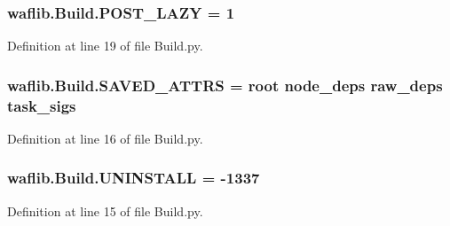 \subsubsection[{\texorpdfstring{P\+O\+S\+T\+\_\+\+L\+A\+ZY}{POST_LAZY}}]{ waflib.\+Build.\+P\+O\+S\+T\+\_\+\+L\+A\+ZY = 1}\hypertarget{namespacewaflib_1_1_build_a475148bf09bf59e2c04c062b0b1b459c}{}\label{namespacewaflib_1_1_build_a475148bf09bf59e2c04c062b0b1b459c}


Definition at line 19 of file Build.\+py.

\subsubsection[{\texorpdfstring{S\+A\+V\+E\+D\+\_\+\+A\+T\+T\+RS}{SAVED_ATTRS}}]{ waflib.\+Build.\+S\+A\+V\+E\+D\+\_\+\+A\+T\+T\+RS = \textquotesingle{}root node\+\_\+deps raw\+\_\+deps task\+\_\+sigs\textquotesingle{}}\hypertarget{namespacewaflib_1_1_build_a4ced62ee7882805b2884b4f334cdfaf7}{}\label{namespacewaflib_1_1_build_a4ced62ee7882805b2884b4f334cdfaf7}


Definition at line 16 of file Build.\+py.

\subsubsection[{\texorpdfstring{U\+N\+I\+N\+S\+T\+A\+LL}{UNINSTALL}}]{ waflib.\+Build.\+U\+N\+I\+N\+S\+T\+A\+LL = -\/1337}\hypertarget{namespacewaflib_1_1_build_a76cd2aad030561e81f048830ecc53deb}{}\label{namespacewaflib_1_1_build_a76cd2aad030561e81f048830ecc53deb}


Definition at line 15 of file Build.\+py.

